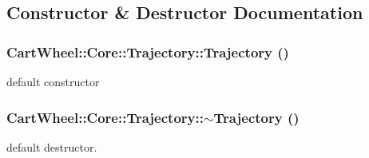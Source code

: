 \subsection{Constructor \& Destructor Documentation}
\hypertarget{classCartWheel_1_1Core_1_1Trajectory_af5db24d3bcd91471ca712478355aa3f5}{
\subsubsection[{Trajectory}]{\setlength{\rightskip}{0pt plus 5cm}CartWheel::Core::Trajectory::Trajectory ()}}
\label{classCartWheel_1_1Core_1_1Trajectory_af5db24d3bcd91471ca712478355aa3f5}
default constructor \hypertarget{classCartWheel_1_1Core_1_1Trajectory_a56e5f2ae7e84baa24bab3385f1b742a6}{
\subsubsection[{$\sim$Trajectory}]{\setlength{\rightskip}{0pt plus 5cm}CartWheel::Core::Trajectory::$\sim$Trajectory ()}}
\label{classCartWheel_1_1Core_1_1Trajectory_a56e5f2ae7e84baa24bab3385f1b742a6}
default destructor. 


